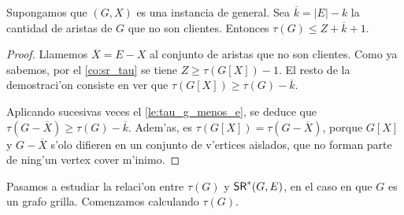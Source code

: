 \begin{lemma}
\label{le:sr_tau_delta}
Supongamos que $(G, X)$ es una instancia de  general. Sea $\overline{k} = |E| - k$ la cantidad de aristas de $G$ que no son clientes. Entonces $\tau(G) \leq Z + \overline{k} + 1$.

\begin{proof}
Llamemos $\overline{X} = E - X$ al conjunto de aristas que no son clientes. Como ya sabemos, por el \autoref{co:sr_tau} se tiene $Z \geq \tau(G[X]) - 1$. El resto de la demostraci'on consiste en ver que $\tau(G[X]) \geq \tau(G) - \overline{k}$.

Aplicando sucesivas veces el \autoref{le:tau_g_menos_e}, se deduce que $\tau(G - \overline{X}) \geq \tau(G) - \overline{k}$. Adem'as, es $\tau(G[X]) = \tau(G - \overline{X})$, porque $G[X]$ y $G - \overline{X}$ s'olo difieren en un conjunto de v'ertices aislados, que no forman parte de ning'un vertex cover m'inimo.
\end{proof}
\end{lemma}

Pasamos a estudiar la relaci'on entre $\tau(G)$ y $\textnormal{\textsf{SR}}^*(G, E)$, en el caso en que $G$ es un grafo grilla. Comenzamos calculando $\tau(G)$.

